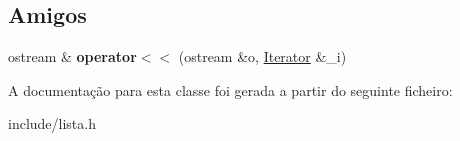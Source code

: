 \subsection*{Amigos}
\begin{DoxyCompactItemize}
\item 
ostream \& {\bfseries operator$<$$<$} (ostream \&o, \hyperlink{classIterator}{Iterator} \&\+\_\+i)\hypertarget{classIterator_af49ba7ddab8d5d66aba19cde407725f1}{}\label{classIterator_af49ba7ddab8d5d66aba19cde407725f1}

\end{DoxyCompactItemize}


A documentação para esta classe foi gerada a partir do seguinte ficheiro\+:\begin{DoxyCompactItemize}
\item 
include/lista.\+h\end{DoxyCompactItemize}
